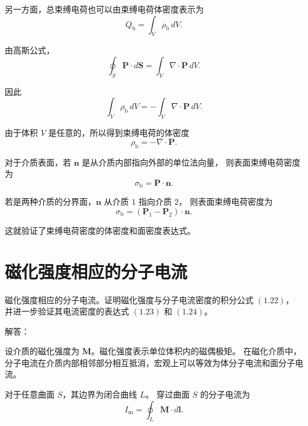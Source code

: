 \documentclass{article}
\begin{document}
另一方面，总束缚电荷也可以由束缚电荷体密度表示为
\begin{equation}
    Q_{\mathrm{b}}
    =
    \int_V \rho_{\mathrm{b}}\,dV.
\end{equation}

由高斯公式，
\begin{equation}
    \oint_S \mathbf{P}\cdot d\mathbf{S}
    =
    \int_V \nabla\cdot \mathbf{P}\,dV.
\end{equation}

因此
\begin{equation}
    \int_V \rho_{\mathrm{b}}\,dV
    =
    -\int_V \nabla\cdot \mathbf{P}\,dV.
\end{equation}

由于体积 $V$ 是任意的，所以得到束缚电荷的体密度
\begin{equation}
    \rho_{\mathrm{b}}
    =
    -\nabla\cdot \mathbf{P}.
\end{equation}

对于介质表面，若 $\mathbf{n}$ 是从介质内部指向外部的单位法向量，
则表面束缚电荷密度为
\begin{equation}
    \sigma_{\mathrm{b}}
    =
    \mathbf{P}\cdot \mathbf{n}.
\end{equation}

若是两种介质的分界面，$\mathbf{n}$ 从介质 $1$ 指向介质 $2$，
则表面束缚电荷密度为
\begin{equation}
    \sigma_{\mathrm{b}}
    =
    \left(
    \mathbf{P}_1-\mathbf{P}_2
    \right)\cdot \mathbf{n}.
\end{equation}

这就验证了束缚电荷密度的体密度和面密度表达式。

\section{磁化强度相应的分子电流}

磁化强度相应的分子电流。证明磁化强度与分子电流密度的积分公式 $(1.22)$，
并进一步验证其电流密度的表达式 $(1.23)$ 和 $(1.24)$。

\noindent
解答：

设介质的磁化强度为 $\mathbf{M}$。磁化强度表示单位体积内的磁偶极矩。
在磁化介质中，分子电流在介质内部相邻部分相互抵消，宏观上可以等效为体分子电流和面分子电流。

对于任意曲面 $S$，其边界为闭合曲线 $L$。
穿过曲面 $S$ 的分子电流为
\begin{equation}
    I_{\mathrm{m}}
    =
    \oint_L \mathbf{M}\cdot d\mathbf{l}.
\end{equation}
\end{document}
